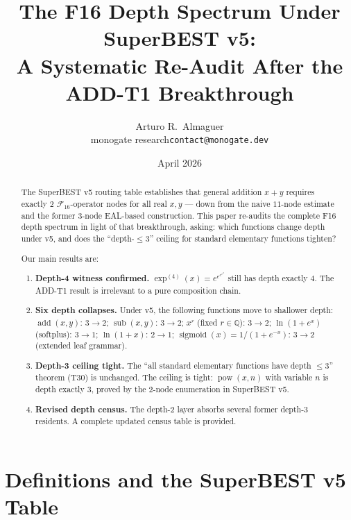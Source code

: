 \documentclass[12pt,a4paper]{article}
\title{The F16 Depth Spectrum Under SuperBEST v5:\\[4pt]
       A Systematic Re-Audit After the ADD-T1 Breakthrough}
\author{Arturo R.\ Almaguer\\
  \small monogate research\quad\texttt{contact@monogate.dev}}
\date{April 2026}
\theoremstyle{definition}
\theoremstyle{remark}
\newcommand{\addop}{\operatorname{add}}
\newcommand{\subop}{\operatorname{sub}}
\newcommand{\powop}{\operatorname{pow}}
\newcommand{\sigmoid}{\operatorname{sigmoid}}
\newcommand{\Q}{\mathbb{Q}}
\begin{document}
\maketitle

\begin{abstract}
The SuperBEST v5 routing table establishes that general addition
$x+y$ requires exactly $2$ $\mathcal{F}_{16}$-operator nodes for all real
$x,y$ --- down from the naive $11$-node estimate and the former $3$-node
EAL-based construction.  This paper re-audits the complete F16 depth spectrum
in light of that breakthrough, asking: which functions change depth under v5,
and does the ``depth-$\leq 3$'' ceiling for standard elementary functions
tighten?

Our main results are:
\begin{enumerate}
  \item \textbf{Depth-4 witness confirmed.}
    $\exp^{(4)}(x) = e^{e^{e^{e^x}}}$ still has depth exactly $4$.
    The ADD-T1 result is irrelevant to a pure composition chain.

  \item \textbf{Six depth collapses.}
    Under v5, the following functions move to shallower depth:
    $\addop(x,y)$: $3\to 2$;
    $\subop(x,y)$: $3\to 2$;
    $x^r$ (fixed $r\in\Q$): $3\to 2$;
    $\ln(1+e^x)$ (softplus): $3\to 1$;
    $\ln(1+x)$: $2\to 1$;
    $\sigmoid(x)=1/(1+e^{-x})$: $3\to 2$ (extended leaf grammar).

  \item \textbf{Depth-3 ceiling tight.}
    The ``all standard elementary functions have depth $\leq 3$'' theorem
    (T30) is unchanged.  The ceiling is tight: $\powop(x,n)$ with variable $n$
    is depth exactly $3$, proved by the 2-node enumeration in SuperBEST v5.

  \item \textbf{Revised depth census.}
    The depth-2 layer absorbs several former depth-3 residents.
    A complete updated census table is provided.
\end{enumerate}
\end{abstract}

\tableofcontents
\bigskip

\section{Definitions and the SuperBEST v5 Table}
\label{sec:defs}
\end{document}
